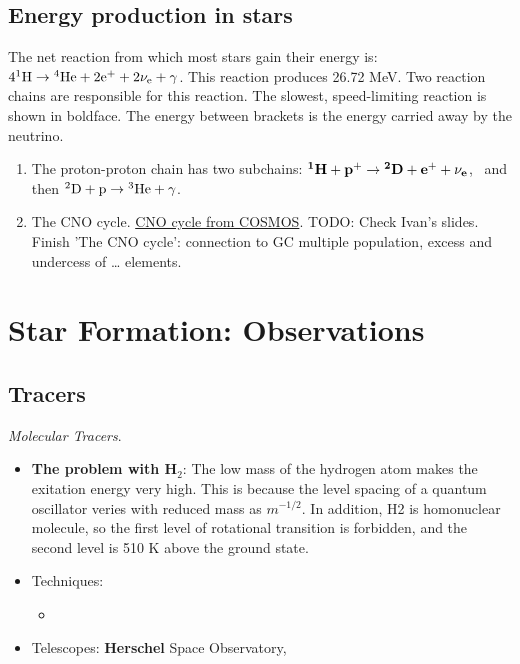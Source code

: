 \subsection{Energy production in stars}
\label{sec:org8d5036a}
The net reaction from which most stars gain their energy is: \(\rm 4{}^1H\rightarrow{}^4He+2e^++2\nu_{\rm e}+\gamma\). This reaction produces 26.72 MeV. Two reaction chains are responsible for this reaction. The slowest, speed-limiting reaction is shown in boldface. The energy between brackets is the energy carried away by the neutrino.

\begin{enumerate}
\item The proton-proton chain has two subchains: \(\bf ^1H+p^+\rightarrow{}^2D+e^++\nu_{\bf e}\),  and then \(\rm ^2D+p\rightarrow{}^3He+\gamma\).

\item The CNO cycle. \href{https://astronomy.swin.edu.au/cosmos/c/cno+cycle\#:\~:text=The\%20'CNO\%20cycle'\%20refers\%20to,ray\%2C\%20producing\%20nitrogen\%2D13.}{CNO cycle from COSMOS}. TODO: Check Ivan's slides. Finish 'The CNO cycle': connection to GC multiple population, excess and undercess of \ldots{} elements.
\end{enumerate}



\section{Star Formation: Observations}
\label{sec:SF:O}

\subsection{Tracers}

\emph{Molecular Tracers}.
\begin{itemize}
\item \textbf{The problem with H\(_2\)}: The low mass of the hydrogen atom makes the exitation energy very high. This is because the level spacing of a quantum oscillator veries with reduced mass as \(m^{-1/2}\). In addition, H2 is homonuclear molecule, so the first level of rotational transition is forbidden, and the second level is 510 K above the ground state.
\item Techniques:
  \begin{itemize}
  \item 
  \end{itemize}
\item Telescopes: \textbf{Herschel} Space Observatory,
\end{itemize}

